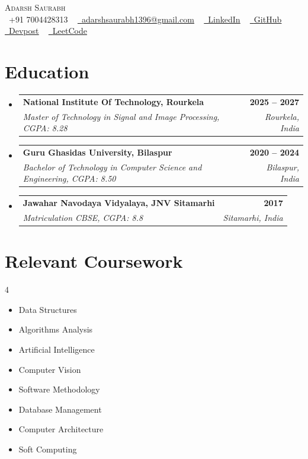 \documentclass[letterpaper,10.5pt]{article}
\makeatletter
\newcommand{\resumeSubheading}[4]{
	\item
	\begin{tabular*}{\textwidth}[t]{l@{\extracolsep{\fill}}r}
		\textbf{#1} & \textbf{\small #2} \\
		\textit{\small#3} & \textit{\small #4} \\
	\end{tabular*}\vspace{-4pt}
}
\newcommand{\resumeSubHeadingListStart}{\begin{itemize}[leftmargin=0.0in, label={}, itemsep=4pt, topsep=2pt]}
\newcommand{\resumeSubHeadingListEnd}{\end{itemize}\vspace{-2pt}}
\makeatother
\begin{document}
	
	\begin{center}
		{\Huge \scshape Adarsh Saurabh} \\ \vspace{4pt}
		\small \raisebox{-0.1\height}\faPhone\ +91 7004428313 ~ 
		\href{mailto:adarshsaurabh1396@gmail.com}{\raisebox{-0.2\height}\faEnvelope\ \underline{adarshsaurabh1396@gmail.com}} ~ 
		\href{https://linkedin.com/in/adarsh-saurabh}{\raisebox{-0.2\height}\faLinkedin\ \underline{LinkedIn}} ~ 
		\href{https://github.com/Adarsh-Saurabh}{\raisebox{-0.2\height}\faGithub\ \underline{GitHub}} ~ 
		\href{https://devpost.com/Adarsh-Saurabh}{\raisebox{-0.2\height}\faCode\ \underline{Devpost}} ~ 
		\href{https://leetcode.com/adarshsaurabh}{\raisebox{-0.2\height}\faLaptopCode\ \underline{LeetCode}}
		\vspace{-4pt}
	\end{center}
	
	\section{Education}
	\resumeSubHeadingListStart
	\resumeSubheading
	{National Institute Of Technology, Rourkela}{2025 -- 2027}
	{Master of Technology in Signal and Image Processing, CGPA: 8.28}{Rourkela, India}
	
	\resumeSubheading
	{Guru Ghasidas University, Bilaspur}{2020 -- 2024}
	{Bachelor of Technology in Computer Science and Engineering, CGPA: 8.50}{Bilaspur, India}
	
	\resumeSubheading
	{Jawahar Navodaya Vidyalaya, JNV Sitamarhi}{2017}
	{Matriculation CBSE, CGPA: 8.8}{Sitamarhi, India}
	\resumeSubHeadingListEnd

	\section{Relevant Coursework}
	\begin{multicols}{4}
		\begin{itemize}[leftmargin=0.15in, itemsep=1pt, parsep=0pt]
			\item\small Data Structures
			\item\small Algorithms Analysis
			\item\small Artificial Intelligence
			\item\small Computer Vision
			\item\small Software Methodology
			\item\small Database Management
			\item\small Computer Architecture
			\item\small Soft Computing
		\end{itemize}
	\end{multicols}
\end{document}
